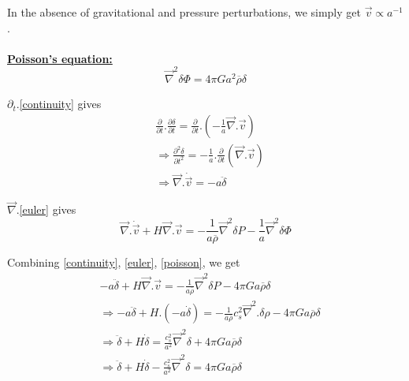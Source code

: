 \documentclass[a4,12pt,oneside]{report}
\begin{document}
	In the absence of gravitational and pressure perturbations, we simply get $ \vec{v}\propto a^{-1} $.
	\\ \\ {\bf \underline{Poisson's equation:}}
	\begin{equation}\label{poisson}
	\overrightarrow{\nabla}^2\delta \Phi = 4\pi Ga^2\overline{\rho}\delta
	\end{equation}
	
	$ \partial_t $.\eqref{continuity} gives
	\begin{align}\label{key}
	&\frac{\partial}{\partial t}.\frac{\partial \delta}{\partial t} = \frac{\partial}{\partial t}.\left(-\frac{1}{a}\overrightarrow{\nabla}.\vec{v}\right)	
	\\
	&\Rightarrow \frac{\partial^2\delta}{\partial t^2} = -\frac{1}{a}.\frac{\partial}{\partial t}(\overrightarrow{\nabla}.\vec{v})
	\\
	&\Rightarrow\overrightarrow{\nabla}.\dot{\vec{v}} = -a\ddot{\delta}  
	\end{align}
	
	$ \overrightarrow{\nabla} $.\eqref{euler} gives 
	\begin{equation}\label{key}
	\overrightarrow{\nabla}.\dot{\vec{v}} + H\overrightarrow{\nabla}.\vec{v} = -\frac{1}{a\overline{\rho}}\overrightarrow{\nabla}^2\delta P - \frac{1}{a}\overrightarrow{\nabla}^2\delta\Phi
	\end{equation}
	
	Combining \eqref{continuity}, \eqref{euler}, \eqref{poisson}, we get
	\begin{align}
	&-a\ddot{\delta} + H\overrightarrow{\nabla}.\vec{v} = -\frac{1}{a\overline{\rho}}\overrightarrow{\nabla}^2 \delta P - 4\pi Ga\overline{\rho}\delta \nonumber
	\\
	&\Rightarrow-a\ddot{\delta} + H.(-a\dot{\delta}) = -\frac{1}{a\overline{\rho}}c_s^2\overrightarrow{\nabla}^2.\delta \rho - 4 \pi Ga\overline{\rho}\delta \nonumber
	\\
	&\Rightarrow \ddot{\delta} + H\dot{\delta} = \frac{c_s^2}{a^2}\overrightarrow{\nabla}^2\delta + 4\pi Ga\overline{\rho}\delta \nonumber
	\\
	&\boxed{\Rightarrow \ddot{\delta}+H\dot{\delta}-\frac{c_s^2}{a^2}\overrightarrow{\nabla}^2\delta = 4\pi Ga\overline{\rho}\delta} \label{einstein de sitter: 1}
	\end{align}
	
\end{document}

